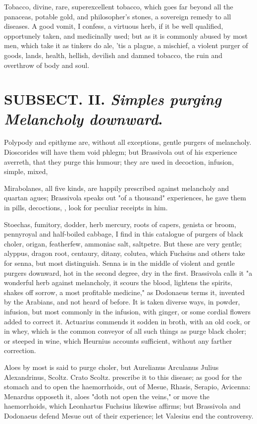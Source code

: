 {Tobacco, divine, rare, superexcellent tobacco, which goes far beyond all the panaceas, potable gold, and philosopher's stones, a sovereign remedy to all diseases. A good vomit, I confess, a virtuous herb, if it be well qualified, opportunely taken, and medicinally used; but as it is commonly abused by most men, which take it as tinkers do ale, 'tis a plague, a mischief, a violent purger of goods, lands, health, hellish, devilish and damned tobacco, the ruin and overthrow of body and soul.

\section{ SUBSECT. II. \emph{Simples purging Melancholy downward}.}


Polypody and epithyme are, without all exceptions, gentle purgers of melancholy. Dioscorides will have them void phlegm; but Brassivola out of his experience averreth, that they purge this humour; they are used in decoction, infusion, \etc{} simple, mixed, \etc{}

Mirabolanes, all five kinds, are happily prescribed against melancholy and quartan agues; Brassivola speaks out "of a thousand" experiences, he gave them in pills, decoctions, \etc{}, look for peculiar receipts in him.

Stoechas, fumitory, dodder, herb mercury, roots of capers, genista or broom, pennyroyal and half-boiled cabbage, I find in this catalogue of purgers of black choler, origan, featherfew, ammoniac salt, saltpetre. But these are very gentle; alyppus, dragon root, centaury, ditany, colutea, which Fuchsius  and others take for senna, but most distinguish. Senna is in the middle of violent and gentle purgers downward, hot in the second degree, dry in the first. Brassivola calls it "a wonderful herb against melancholy, it scours the blood, lightens the spirits, shakes off sorrow, a most profitable medicine," as Dodonaeus terms it, invented by the Arabians, and not heard of before. It is taken diverse ways, in powder, infusion, but most commonly in the infusion, with ginger, or some cordial flowers added to correct it. Actuarius commends it sodden in broth, with an old cock, or in whey, which is the common conveyor of all such things as purge black choler; or steeped in wine, which Heurnius accounts sufficient, without any farther correction.

Aloes by most is said to purge choler, but Aurelianus  Arculanus  Julius Alexandrinus,  Scoltz. Crato  Scoltz. prescribe it to this disease; as good for the stomach and to open the haemorrhoids, out of Mesue, Rhasis, Serapio, Avicenna: Menardus  opposeth it, aloes "doth not open the veins," or move the haemorrhoids, which Leonhartus Fuchsius  likewise affirms; but Brassivola and Dodonaeus defend Mesue out of their experience; let Valesius end the controversy.

}
